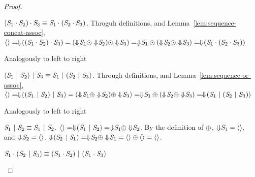 \documentclass[acmsmall]{acmart}
\begin{document}
\begin{proof}
  \begin{case}
    $(\mathit{S}_1 \cdot \mathit{S}_2) \cdot \mathit{S}_3 \equiv
    \mathit{S}_1 \cdot (\mathit{S}_2 \cdot \mathit{S}_3)$.
    Throguh definitions, and Lemma~\ref{lem:sequence-concat-assoc},
    $\langle\rangle = \Downarrow\mkern-4mu ((\mathit{S}_1 \cdot \mathit{S}_2) \cdot \mathit{S}_3) =
    (\Downarrow\mkern-4mu \mathit{S}_1 \odot \Downarrow\mkern-4mu \mathit{S}_2) \odot
    \Downarrow\mkern-4mu \mathit{S}_3) =
    \Downarrow\mkern-4mu \mathit{S}_1 \odot (\Downarrow\mkern-4mu \mathit{S}_2 \odot
    \Downarrow\mkern-4mu \mathit{S}_3) =
    \Downarrow\mkern-4mu (\mathit{S}_1 \cdot (\mathit{S}_2 \cdot \mathit{S}_3))$
  \end{case}

  \begin{case}
    Analogously to left to right
  \end{case}

  \begin{case}
    $(\mathit{S}_1 ~|~ \mathit{S}_2) ~|~ \mathit{S}_3 \equiv
    \mathit{S}_1 ~|~ (\mathit{S}_2 ~|~ \mathit{S}_3)$.
    Through definitions, and Lemma~\ref{lem:sequence-or-assoc},
    $\langle\rangle = \Downarrow\mkern-4mu ((\mathit{S}_1 ~|~ \mathit{S}_2) ~|~ \mathit{S}_3) =
    (\Downarrow\mkern-4mu \mathit{S}_1 \oplus \Downarrow\mkern-4mu \mathit{S}_2) \oplus
    \Downarrow\mkern-4mu \mathit{S}_3) =
    \Downarrow\mkern-4mu \mathit{S}_1 \oplus (\Downarrow\mkern-4mu \mathit{S}_2 \oplus
    \Downarrow\mkern-4mu \mathit{S}_3) =
    \Downarrow\mkern-4mu (\mathit{S}_1 ~|~ (\mathit{S}_2 ~|~ \mathit{S}_3))$
  \end{case}

  \begin{case}
    Analogously to left to right
  \end{case}

  \begin{case}[\OrCommutativityRule{}]
    $\mathit{S}_1 ~|~ \mathit{S}_2 \equiv \mathit{S}_1 ~|~ \mathit{S}_2$.
    $\langle\rangle = \Downarrow\mkern-4mu (\mathit{S}_1 ~|~ \mathit{S}_2) =
    \Downarrow\mkern-4mu \mathit{S}_1 \oplus \Downarrow\mkern-4mu \mathit{S}_2$.
    By the definition of $\oplus$, $\Downarrow\mkern-4mu \mathit{S}_1 = \langle\rangle$, and
    $\Downarrow\mkern-4mu \mathit{S}_2 = \langle\rangle$.
    $\Downarrow\mkern-4mu (\mathit{S}_2 ~|~ \mathit{S}_1) =
    \Downarrow\mkern-4mu \mathit{S}_2 \oplus \Downarrow\mkern-4mu \mathit{S}_1 =
    \langle\rangle \oplus \langle\rangle = \langle\rangle$.
  \end{case}

  \begin{case}
    $\mathit{S}_1\cdot(\mathit{S}_2~|~\mathit{S}_3) \equiv
    (\mathit{S}_1\cdot\mathit{S}_2)~|~(\mathit{S}_1\cdot\mathit{S}_3)$


\end{case}
\end{proof}
\end{document}
